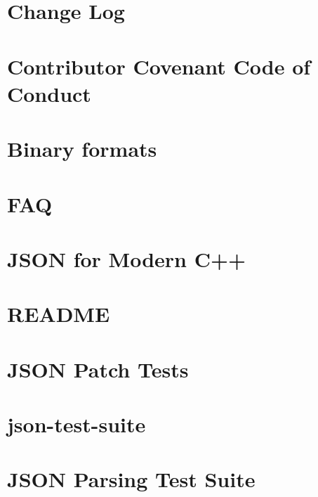 \let\mypdfximage\pdfximage\def\pdfximage{\immediate\mypdfximage}\documentclass[twoside]{book}
\newcommand{\+}{\discretionary{\mbox{\scriptsize$\hookleftarrow$}}{}{}}
\begin{document}
\chapter{Change Log}
\label{md_json-develop_ChangeLog}

\chapter{Contributor Covenant Code of Conduct}
\label{md_json-develop_CODE_OF_CONDUCT}

\chapter{Binary formats}
\label{md_json-develop_doc_binary_formats}

\chapter{F\+AQ}
\label{md_json-develop_doc_faq}

\chapter{J\+S\+ON for Modern C++}
\label{md_json-develop_doc_index}

\chapter{R\+E\+A\+D\+ME}
\label{md_json-develop_README}

\chapter{J\+S\+ON Patch Tests}
\label{md_json-develop_test_data_json-patch-tests_README}

\chapter{json-\/test-\/suite}
\label{md_json-develop_test_data_json_testsuite_README}

\chapter{J\+S\+ON Parsing Test Suite}
\label{md_json-develop_test_data_nst_json_testsuite2_README}

\end{document}
